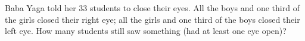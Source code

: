 Baba Yaga told her $33$ students to close their eyes. All the boys and one third of the girls closed their right eye; all the girls and one third of the boys closed their left eye. How many students still saw something (had at least one eye open)?
